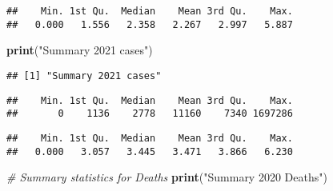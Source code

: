 \documentclass[
]{article}
\newenvironment{Shaded}{\begin{snugshade}}{\end{snugshade}}
\newcommand{\CommentTok}[1]{\textcolor[rgb]{0.56,0.35,0.01}{\textit{#1}}}
\newcommand{\ConstantTok}[1]{\textcolor[rgb]{0.56,0.35,0.01}{#1}}
\newcommand{\FunctionTok}[1]{\textcolor[rgb]{0.13,0.29,0.53}{\textbf{#1}}}
\newcommand{\NormalTok}[1]{#1}
\newcommand{\SpecialCharTok}[1]{\textcolor[rgb]{0.81,0.36,0.00}{\textbf{#1}}}
\newcommand{\StringTok}[1]{\textcolor[rgb]{0.31,0.60,0.02}{#1}}
\begin{document}
\begin{Shaded}
\end{Shaded}

\begin{verbatim}
##    Min. 1st Qu.  Median    Mean 3rd Qu.    Max. 
##   0.000   1.556   2.358   2.267   2.997   5.887
\end{verbatim}

\begin{Shaded}
\begin{Highlighting}[]
\FunctionTok{print}\NormalTok{(}\StringTok{"Summary 2021 cases"}\NormalTok{)}
\end{Highlighting}
\end{Shaded}

\begin{verbatim}
## [1] "Summary 2021 cases"
\end{verbatim}

\begin{Shaded}
\end{Shaded}

\begin{verbatim}
##    Min. 1st Qu.  Median    Mean 3rd Qu.    Max. 
##       0    1136    2778   11160    7340 1697286
\end{verbatim}

\begin{Shaded}
\end{Shaded}

\begin{verbatim}
##    Min. 1st Qu.  Median    Mean 3rd Qu.    Max. 
##   0.000   3.057   3.445   3.471   3.866   6.230
\end{verbatim}

\begin{Shaded}
\begin{Highlighting}[]
\CommentTok{\# Summary statistics for Deaths}
\FunctionTok{print}\NormalTok{(}\StringTok{"Summary 2020 Deaths"}\NormalTok{)}
\end{Highlighting}
\end{Shaded}
\end{document}

